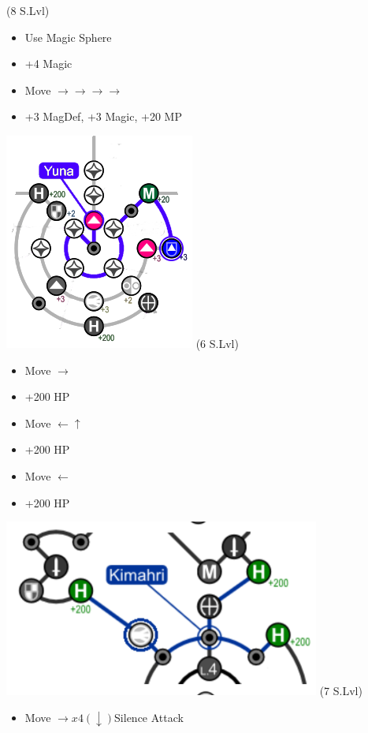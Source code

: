 \begin{spheregrid}
  \begin{itemize}
    \yunaf (8 S.Lvl)
    \begin{itemize}
      \item Use Magic Sphere
      \item +4 Magic
      \item Move $\rightarrow\rightarrow\rightarrow\rightarrow$
      \item +3 MagDef, +3 Magic, +20 MP
    \end{itemize}
    \includegraphics{graphics/Yuna_MRR_1}
    \kimahrif (6 S.Lvl)
    \begin{itemize}
      \item Move $\rightarrow$
      \item +200 HP
      \item Move $\leftarrow\uparrow$
      \item +200 HP
      \item Move $\leftarrow$
      \item +200 HP
    \end{itemize}
    \includegraphics{graphics/kimahrimmr}
    \wakkaf (7 S.Lvl)
    \begin{itemize}
      \item Move $\rightarrow x4 (\downarrow)$Silence Attack

\end{itemize}
\end{itemize}
\end{spheregrid}
